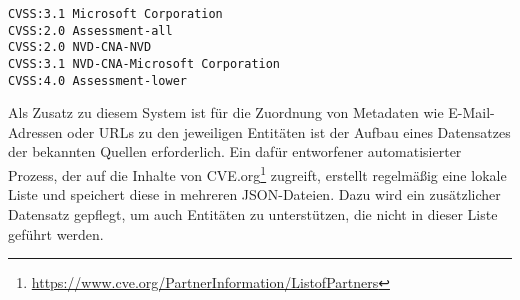 \begin{lstlisting}[language={}, label={lst:cvss-source-format-examples}, caption={CVSS Sources Format}]
CVSS:3.1 Microsoft Corporation
CVSS:2.0 Assessment-all
CVSS:2.0 NVD-CNA-NVD
CVSS:3.1 NVD-CNA-Microsoft Corporation
CVSS:4.0 Assessment-lower
\end{lstlisting}

Als Zusatz zu diesem System ist für die Zuordnung von Metadaten wie E-Mail-Adressen oder URLs zu den jeweiligen Entitäten ist der Aufbau eines Datensatzes der bekannten Quellen erforderlich.
Ein dafür entworfener automatisierter Prozess, der auf die Inhalte von CVE.org\footnote{\url{https://www.cve.org/PartnerInformation/ListofPartners}} zugreift, erstellt regelmäßig eine lokale Liste und speichert diese in mehreren JSON-Dateien.
Dazu wird ein zusätzlicher Datensatz gepflegt, um auch Entitäten zu unterstützen, die nicht in dieser Liste geführt werden.
